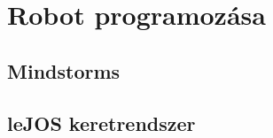 \chapter{Robot programozása}\label{ch:PROG}
\section{Mindstorms}\label{sec:PROG:mindstorms}
\section{leJOS keretrendszer}\label{sec:PROG:lejos}